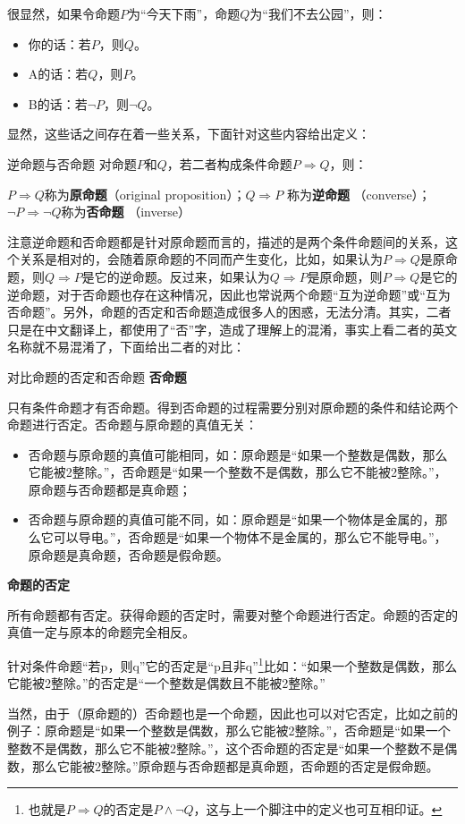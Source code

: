 很显然，如果令命题$P$为“今天下雨”，命题$Q$为“我们不去公园”，则：
\begin{itemize}
\item 你的话：若$P$，则$Q$。
\item A的话：若$Q$，则$P$。
\item B的话：若$\lnot P$，则$\lnot Q$。
\end{itemize}

显然，这些话之间存在着一些关系，下面针对这些内容给出定义：

\begin{definition}{逆命题与否命题}\label{def_HsCoPr_4}
对命题$P$和$Q$，若二者构成条件命题$P \Rightarrow Q$，则：

$P \Rightarrow Q$称为\textbf{原命题}（original proposition）；$Q \Rightarrow P$ 称为\textbf{逆命题} （converse）；$\neg P \Rightarrow \neg Q $称为\textbf{否命题} （inverse）
\end{definition}

注意逆命题和否命题都是针对原命题而言的，描述的是两个条件命题间的关系，这个关系是相对的，会随着原命题的不同而产生变化，比如，如果认为$P \Rightarrow Q$是原命题，则$Q \Rightarrow P$是它的逆命题。反过来，如果认为$Q \Rightarrow P$是原命题，则$P \Rightarrow Q$是它的逆命题，对于否命题也存在这种情况，因此也常说两个命题“互为逆命题”或“互为否命题”。另外，命题的否定和否命题造成很多人的困惑，无法分清。其实，二者只是在中文翻译上，都使用了“否”字，造成了理解上的混淆，事实上看二者的英文名称就不易混淆了，下面给出二者的对比：

\begin{example}{对比命题的否定和否命题}\label{ex_HsCoPr_1}
\textbf{否命题}

只有条件命题才有否命题。得到否命题的过程需要分别对原命题的条件和结论两个命题进行否定。否命题与原命题的真值无关：
\begin{itemize}
\item 否命题与原命题的真值可能相同，如：原命题是“如果一个整数是偶数，那么它能被2整除。”，否命题是“如果一个整数不是偶数，那么它不能被2整除。”，原命题与否命题都是真命题；
\item 否命题与原命题的真值可能不同，如：原命题是“如果一个物体是金属的，那么它可以导电。”，否命题是“如果一个物体不是金属的，那么它不能导电。”，原命题是真命题，否命题是假命题。
\end{itemize}

\textbf{命题的否定}

所有命题都有否定。获得命题的否定时，需要对整个命题进行否定。命题的否定的真值一定与原本的命题完全相反。

针对条件命题“若p，则q”它的否定是“p且非q”\footnote{也就是$P\Rightarrow Q$的否定是$P\land\neg Q$，这与上一个脚注中的定义也可互相印证。}比如：“如果一个整数是偶数，那么它能被2整除。”的否定是“一个整数是偶数且不能被2整除。”

当然，由于（原命题的）否命题也是一个命题，因此也可以对它否定，比如之前的例子：原命题是“如果一个整数是偶数，那么它能被2整除。”，否命题是“如果一个整数不是偶数，那么它不能被2整除。”，这个否命题的否定是“如果一个整数不是偶数，那么它能被2整除。”原命题与否命题都是真命题，否命题的否定是假命题。
\end{example}

